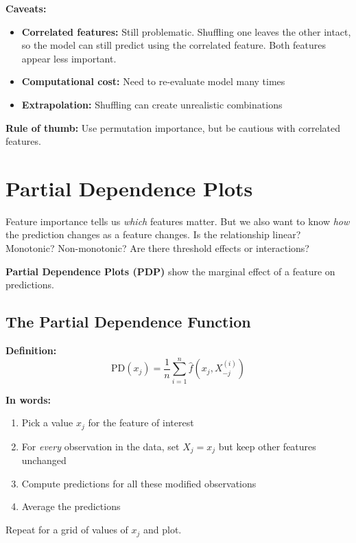 \documentclass[11pt,a4paper]{article}
\newcommand{\keyword}[1]{\textbf{\textcolor{AccentOrange}{#1}}}
\begin{document}
\textbf{Caveats:}
\begin{itemize}
    \item \textbf{Correlated features:} Still problematic. Shuffling one leaves the other intact, so the model can still predict using the correlated feature. Both features appear less important.
    \item \textbf{Computational cost:} Need to re-evaluate model many times
    \item \textbf{Extrapolation:} Shuffling can create unrealistic combinations
\end{itemize}

\textbf{Rule of thumb:} Use permutation importance, but be cautious with correlated features.

\section{Partial Dependence Plots}

Feature importance tells us \emph{which} features matter. But we also want to know \emph{how} the prediction changes as a feature changes. Is the relationship linear? Monotonic? Non-monotonic? Are there threshold effects or interactions?

\keyword{Partial Dependence Plots (PDP)} show the marginal effect of a feature on predictions.

\subsection{The Partial Dependence Function}

\textbf{Definition:}
\[
\text{PD}(x_j) = \frac{1}{n} \sum_{i=1}^{n} \widehat{f}(x_j, X_{-j}^{(i)})
\]

\textbf{In words:}
\begin{enumerate}
    \item Pick a value $x_j$ for the feature of interest
    \item For \emph{every} observation in the data, set $X_j = x_j$ but keep other features unchanged
    \item Compute predictions for all these modified observations
    \item Average the predictions
\end{enumerate}
Repeat for a grid of values of $x_j$ and plot.
\end{document}

